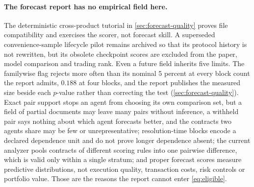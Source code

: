 \paragraph{The forecast report has no empirical field here.} The deterministic cross-product tutorial in \cref{sec:forecast-quality} proves file compatibility and exercises the scorer, not forecast skill. A superseded convenience-sample lifecycle pilot remains archived so that its protocol history is not rewritten, but its obsolete checkpoint scores are excluded from the paper, model comparison and trading rank. Even a future field inherits five limits. The familywise flag rejects more often than its nominal 5 percent at every block count the report admits, $0.188$ at four blocks, and the report publishes the measured size beside each $p$-value rather than correcting the test (\cref{sec:forecast-quality}). Exact pair support stops an agent from choosing its own comparison set, but a field of partial documents may leave many pairs without inference, a withheld pair says nothing about which agent forecasts better, and the contracts two agents share may be few or unrepresentative; resolution-time blocks encode a declared dependence unit and do not prove longer dependence absent; the current analyzer pools contracts of different scoring rules into one pairwise difference, which is valid only within a single stratum; and proper forecast scores measure predictive distributions, not execution quality, transaction costs, risk controls or portfolio value. Those are the reasons the report cannot enter \cref{eq:eligible}.

